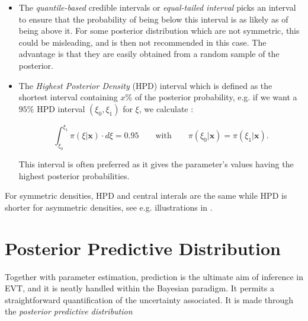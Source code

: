 \begin{itemize}
	\item The \emph{quantile-based} credible intervals or \emph{equal-tailed interval} picks an interval to ensure that the probability of being below this interval is as likely as of being above it. 
	For some posterior distribution which are not symmetric, this could be misleading, and is then not recommended in this case. 
	The advantage is that they are easily obtained from a random sample of the posterior.
	\item The \emph{Highest Posterior Density} (HPD) interval which is defined as the shortest interval containing $x\%$ of the posterior probability, e.g. if we want a $95\%$ HPD interval $(\xi_0,\xi_1)$ for $\xi$, we calculate :
		
	\begin{equation} 
	\int_{\xi_0}^{\xi_1}\pi(\xi|\boldsymbol{x})\cdot d\xi=0.95 \qquad\text{with}\qquad \pi(\xi_0|\boldsymbol{x})=\pi(\xi_1|\boldsymbol{x}).
	\end{equation}
		
	This interval is often preferred as it gives the parameter's values having the highest posterior probabilities. 
		
\end{itemize}
For symmetric densities, HPD and central interals are the same while HPD is shorter for asymmetric densities, see e.g. illustrations in \citet{liu_simulation-efficient_2015}.


\section{Posterior Predictive Distribution}\label{sec:ppd}

Together with parameter estimation, prediction is the ultimate aim of inference in EVT, and it is neatly handled within the Bayesian paradigm. It permits a straightforward quantification of the uncertainty associated. It is made through the \emph{posterior predictive distribution}

